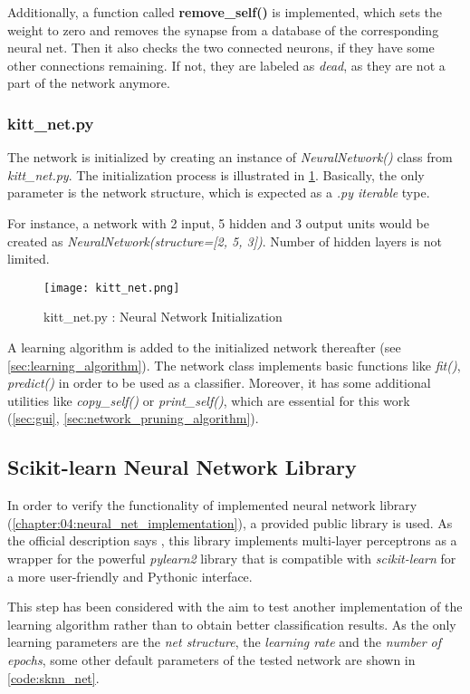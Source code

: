 Additionally, a function called \textbf{remove\_self()} is implemented, which sets the weight to zero and removes the synapse from a database of the corresponding neural net. Then it also checks the two connected neurons, if they have some other connections remaining. If not, they are labeled as \textit{dead}, as they are not a part of the network anymore.

\subsubsection*{kitt\_net.py} \label{ssec:kitt_net}
The network is initialized by creating an instance of \textit{NeuralNetwork()} class from \textit{kitt\_net.py}. The initialization process is illustrated in \cref{img:kitt_net}. Basically, the only parameter is the network structure, which is expected as a \textit{.py iterable} type. 

For instance, a network with 2 input, 5 hidden and 3 output units would be created as \textit{NeuralNetwork(structure=[2, 5, 3])}. Number of hidden layers is not limited.

\begin{figure}[H]
  \centering
  \texttt{[image: kitt\_net.png]}
  \caption{kitt\_net.py : Neural Network Initialization}
  \label{img:kitt_net}
\end{figure}

A learning algorithm is added to the initialized network thereafter (see \cref{sec:learning_algorithm}). The network class implements basic functions like \textit{fit()}, \textit{predict()} in order to be used as a classifier. Moreover, it has some additional utilities like \textit{copy\_self()} or \textit{print\_self()}, which are essential for this work (\cref{sec:gui}, \cref{sec:network_pruning_algorithm}).

\subsection*{Scikit-learn Neural Network Library} \label{ssec:sknn}
In order to verify the functionality of implemented neural network library (\cref{chapter:04:neural_net_implementation}), a provided public library is used. As the official description says \citep{misc:sknn}, this library implements multi-layer perceptrons as a wrapper for the powerful \textit{pylearn2} library that is compatible with \textit{scikit-learn} for a more user-friendly and Pythonic interface.

This step has been considered with the aim to test another implementation of the learning algorithm rather than to obtain better classification results. As the only learning parameters are the \textit{net structure}, the \textit{learning rate} and the \textit{number of epochs}, some other default parameters of the tested network are shown in \cref{code:sknn_net}.

